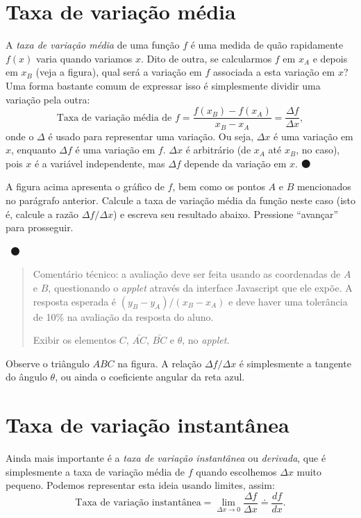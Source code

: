 \documentclass[fleqn,12pt]{scrartcl}
\newenvironment{ct}{\begin{quotation}\color{red!30!black}\sffamily\small Comentário técnico:}{\end{quotation}} %
\newcommand\foreign[1]{\textsl{#1}}
\newcommand\proceed{\textcolor{green!50!black}{$\medbullet$}\xspace}
\newcommand\answerfield{\framebox[3cm]{\phantom{A}}~\proceed}
\begin{document}
    \section{Taxa de variação média}

    A \emph{taxa de variação média} de uma função $f$ é uma medida de quão rapidamente $f(x)$ varia quando variamos $x$. Dito de outra, se calcularmos $f$ em $x_A$ e depois em $x_B$ (veja a figura), qual será a variação em $f$ associada a esta variação em $x$? Uma forma bastante comum de expressar isso é simplesmente dividir uma variação pela outra:
    \begin{equation*}
	\text{Taxa de variação média de $f$} = \frac{f(x_B) - f(x_A)}{x_B - x_A} = \frac{\Delta f}{\Delta x},
    \end{equation*}
    onde o $\Delta$ é usado para representar uma variação. Ou seja, $\Delta x$ é uma variação em $x$, enquanto $\Delta f$ é uma variação em $f$. $\Delta x$ é arbitrário (de $x_A$ até $x_B$, no caso), pois $x$ é a variável independente, mas $\Delta f$ depende da variação em $x$. \proceed

    A figura acima apresenta o gráfico de $f$, bem como os pontos $A$ e $B$ mencionados no parágrafo anterior. Calcule a taxa de variação média da função neste caso (isto é, calcule a razão $\Delta f/\Delta x$) e escreva seu resultado abaixo. Pressione ``avançar'' para prosseguir.

    \answerfield

    \begin{ct}
	a avaliação deve ser feita usando as coordenadas de $A$ e $B$, questionando o \foreign{applet} através da interface Javascript que ele expõe. A resposta esperada é $(y_B - y_A)/(x_B - x_A)$ e deve haver uma tolerância de 10\% na avaliação da resposta do aluno.

	Exibir os elementos $C$, $\bar{AC}$, $\bar{BC}$ e $\theta$, no \foreign{applet}.
    \end{ct}

    Observe o triângulo $ABC$ na figura. A relação $\Delta f/\Delta x$ é simplesmente a tangente do ângulo $\theta$, ou ainda o coeficiente angular da reta azul.

    \section{Taxa de variação instantânea}

    Ainda mais importante é a \emph{taxa de variação instantânea} ou \emph{derivada}, que é simplesmente a taxa de variação média de $f$ quando escolhemos $\Delta x$ muito pequeno. Podemos representar esta ideia usando limites, assim:
    \begin{equation*}
	\text{Taxa de variação instantânea} = \lim_{\Delta x \to 0} \frac{\Delta f}{\Delta x} \doteq \frac{df}{dx}.
    \end{equation*}
    
\end{document}
